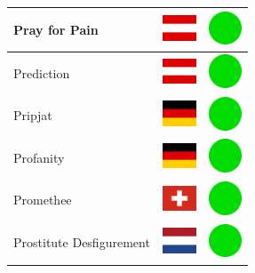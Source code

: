 \documentclass[12pt, a4paper, twoside]{report}
\begin{document}
\begin{center}
\begin{longtable}{|p{5cm}|p{2cm}|p{2cm}|}
 Pray for Pain                                              & \includegraphics[width=1cm]{../img/flags/at} &   \includegraphics[width=1cm]{../likes/y} \\ \hline
 Prediction                                                 & \includegraphics[width=1cm]{../img/flags/at} &   \includegraphics[width=1cm]{../likes/y} \\ \hline
 Pripjat                                                    & \includegraphics[width=1cm]{../img/flags/de} &   \includegraphics[width=1cm]{../likes/y} \\ \hline
 Profanity                                                  & \includegraphics[width=1cm]{../img/flags/de} &   \includegraphics[width=1cm]{../likes/y} \\ \hline
 Promethee                                                  & \includegraphics[width=1cm]{../img/flags/ch} &   \includegraphics[width=1cm]{../likes/y} \\ \hline
 Prostitute Desfigurement                                   & \includegraphics[width=1cm]{../img/flags/nl} &   \includegraphics[width=1cm]{../likes/y} \\ \hline

\end{longtable}
\end{center}
\end{document}

